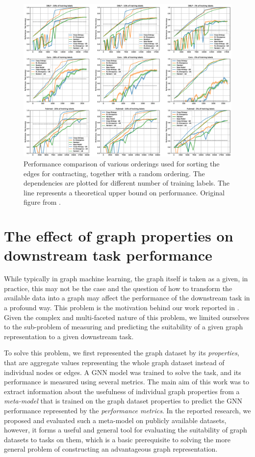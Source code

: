 \begin{figure}
	\includegraphics[width=\linewidth]{images/direct-graph-coarsening-results.eps}
	\caption{Performance comparison of various orderings used for sorting the edges for contracting, together with a random ordering. The dependencies are plotted for different number of training labels. The line represents a theoretical upper bound on performance. Original figure from \cite{prochazka_scalable_2022}.}
	\label{fig:direct-graph-coarsening-results}
\end{figure}

\section{The effect of graph properties on downstream task performance}\label{sec:graph-property-effect}

While typically in graph machine learning, the graph itself is taken as a given, in practice, this may not be the case and the question of how to transform the available data into a graph may affect the performance of the downstream task in a profound way. This problem is the motivation behind our work reported in \cite{prochazka_which_2023}. Given the complex and multi-faceted nature of this problem, we limited ourselves to the sub-problem of measuring and predicting the suitability of a given graph representation to a given downstream task.

To solve this problem, we first represented the graph dataset by its \emph{properties}, that are aggregate values representing the whole graph dataset instead of individual nodes or edges. A GNN model \cite{hamilton_inductive_2017} was trained to solve the task, and its performance is measured using several metrics. The main aim of this work was to extract information about the usefulness of individual graph properties from a \emph{meta-model} that is trained on the graph dataset properties to predict the GNN performance represented by the \emph{performance metrics}.
In the reported research, we proposed and evaluated such a meta-model on publicly available datasets, however, it forms a useful and general tool for evaluating the suitability of graph datasets to tasks on them, which is a basic prerequisite to solving the more general problem of constructing an advantageous graph representation.


